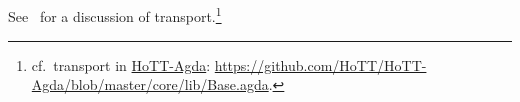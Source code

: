 \begin{code}%
\>[0][@{}l@{\AgdaIndent{0}}]%
\>[1]\AgdaSpace{}%
\AgdaSymbol{:}\AgdaSpace{}%
\AgdaSymbol{\{}\AgdaSpace{}%
\AgdaSymbol{:}\AgdaSpace{}%
\AgdaSymbol{\}}\AgdaSpace{}%
\AgdaSymbol{(}\AgdaSpace{}%
\AgdaSymbol{:}\AgdaSpace{}%
\AgdaSpace{}%
\AgdaSpace{}%
\AgdaSymbol{)}\AgdaSpace{}%
\AgdaSpace{}%
\AgdaSpace{}%
\AgdaSpace{}%
\<%
\\
%
\>[1]\AgdaSpace{}%
\AgdaSpace{}%
\AgdaSymbol{=}\AgdaSpace{}%
\AgdaSpace{}%
\AgdaSpace{}%
\AgdaSpace{}%
\<%
\\
%
\\[\AgdaEmptyExtraSkip]%
%
\>[1]\AgdaSpace{}%
\AgdaSymbol{:}\AgdaSpace{}%
\AgdaSymbol{\{}\AgdaSpace{}%
\AgdaSymbol{:}\AgdaSpace{}%
\AgdaSpace{}%
\AgdaSpace{}%
\AgdaSymbol{\}}\AgdaSpace{}%
\AgdaSymbol{(}\AgdaSpace{}%
\AgdaSymbol{:}\AgdaSpace{}%
\AgdaSpace{}%
\AgdaSpace{}%
\AgdaSpace{}%
\AgdaSpace{}%
\AgdaSymbol{)}\AgdaSpace{}%
\AgdaSymbol{\{}\AgdaSpace{}%
\AgdaSpace{}%
\AgdaSymbol{:}\AgdaSpace{}%
\AgdaSymbol{\}}\AgdaSpace{}%
\AgdaSpace{}%
\AgdaSpace{}%
\AgdaSpace{}%
\AgdaSpace{}%
\AgdaSpace{}%
\AgdaSpace{}%
\AgdaSpace{}%
\AgdaSpace{}%
\AgdaSpace{}%
\<%
\\
%
\>[1]\AgdaSpace{}%
\AgdaSpace{}%
\AgdaSymbol{(}\AgdaSpace{}%
\AgdaSymbol{\{}\AgdaSpace{}%
\AgdaSymbol{=}\AgdaSpace{}%
\AgdaSymbol{\})}\AgdaSpace{}%
\AgdaSymbol{=}\AgdaSpace{}%
\AgdaSpace{}%
\AgdaSymbol{(}\AgdaSpace{}%
\AgdaSymbol{)}\<%
\end{code}
\ccpad
See~\cite{MHE} for a discussion of transport.\footnote{cf.~transport in \href{https://github.com/HoTT/HoTT-Agda/blob/master/core/lib/Base.agda}{HoTT-Agda}: \url{https://github.com/HoTT/HoTT-Agda/blob/master/core/lib/Base.agda}.}

